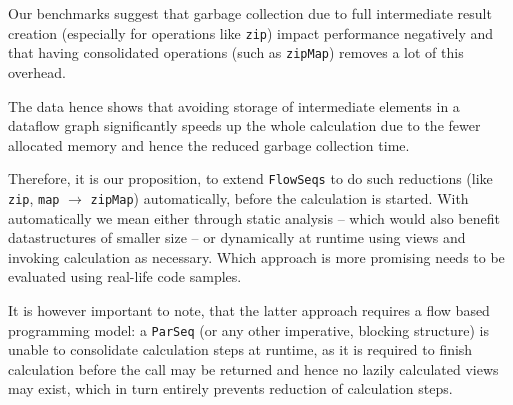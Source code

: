 \documentclass[runningheads,a4paper,fleqn]{llncs}
\begin{document}
Our benchmarks suggest that garbage collection due to full
intermediate result creation (especially for operations like
\texttt{zip}) impact performance negatively and that having
consolidated operations (such as \texttt{zipMap}) removes a lot of
this overhead.

The data hence shows that avoiding storage of intermediate elements in
a dataflow graph significantly speeds up the whole calculation due to the fewer
allocated memory and hence the reduced garbage collection time.

Therefore, it is our proposition, to extend \texttt{FlowSeqs} to do such
reductions (like \texttt{zip}, \texttt{map} $\to$ \texttt{zipMap})
automatically, before the calculation is started. With automatically
we mean either through static analysis -- which would also benefit
datastructures of smaller size -- or dynamically at runtime using
views and invoking calculation as necessary. Which approach is more
promising needs to be evaluated using real-life code samples.

It is however important to note, that the latter approach requires a
flow based programming model: a \texttt{ParSeq} (or any other imperative,
blocking structure) is unable to consolidate calculation steps at
runtime, as it is required to finish calculation before the call may
be returned and hence no lazily calculated views may exist, which in
turn entirely prevents reduction of calculation steps.



\end{document}
